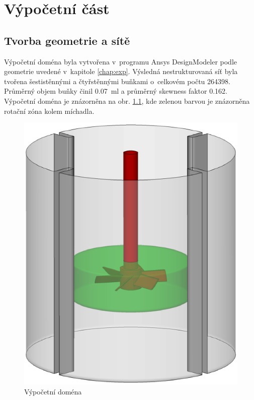 \chapter{Výpočetní část}

\section{Tvorba geometrie a sítě}

Výpočetní doména byla vytvořena v~programu Ansys DesignModeler podle geometrie uvedené v~kapitole \ref{chap:exp}. Výsledná nestrukturovaná síť byla tvořena šestistěnnými a čtyřstěnnými buňkami o~celkovém počtu \num{264398}. Průměrný objem buňky činil \SI{0.07}{\milli\litre} a průměrný skewness faktor \num{0.162}. Výpočetní doména je znázorněna na obr. \ref{fig:geo}, kde zelenou barvou je znázorněna rotační zóna kolem míchadla. 

\begin{figure}[h!]
\centering
\includegraphics[scale=0.5]{images/geo.eps}
\caption{Výpočetní doména}
\label{fig:geo}
\end{figure} 


